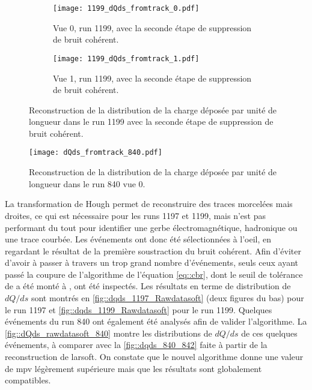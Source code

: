       \begin{figure}[htbp]
        \centering
        \begin{subfigure}[t]{0.48\textwidth}
          \centering
          \texttt{[image: 1199\_dQds\_fromtrack\_0.pdf]}
          \caption[]{Vue 0, run 1199, avec la seconde étape de suppression de bruit cohérent.}
        \end{subfigure}\hfill
        \begin{subfigure}[t]{0.48\textwidth}
          \centering
          \texttt{[image: 1199\_dQds\_fromtrack\_1.pdf]}
          \caption[]{Vue 1, run 1199, avec la seconde étape de suppression de bruit cohérent.}
        \end{subfigure}
        \caption[Reconstruction de la distribution de la charge déposée par unité de longueur dans le run 1199.]{\label{fig::dqds_1199_Rawdatasoft}Reconstruction de la distribution de la charge déposée par unité de longueur dans le run 1199 avec la seconde étape de suppression de bruit cohérent.}
      \end{figure}

      \begin{figure}[htbp]      
        \centering
        \texttt{[image: dQds\_fromtrack\_840.pdf]}
        \caption[Test de l'algorithme sur le run 840.]{\label{fig::dQds_rawdatasoft_840}Reconstruction de la distribution de la charge déposée par unité de longueur dans le run 840 vue 0.}
      \end{figure}

      La transformation de Hough permet de reconstruire des traces morcelées mais droites, ce qui est nécessaire pour les runs 1197 et 1199, mais n'est pas performant du tout pour identifier une gerbe électromagnétique, hadronique ou une trace courbée. Les événements ont donc été sélectionnées à l'oeil, en regardant le résultat de la première soustraction du bruit cohérent. Afin d'éviter d'avoir à passer à travers un trop grand nombre d'événements, seuls ceux ayant passé la coupure de l'algorithme de l'équation \eqref{eq::cbr}, dont le seuil de tolérance de  a été monté à , ont été inspectés. Les résultats en terme de distribution de $dQ/ds$ sont montrés en \autoref{fig::dqds_1197_Rawdatasoft} (deux figures du bas) pour le run 1197 et \autoref{fig::dqds_1199_Rawdatasoft} pour le run 1199. Quelques événements du run 840 ont également été analysés afin de valider l'algorithme. La \autoref{fig::dQds_rawdatasoft_840} montre les distributions de $dQ/ds$ de ces quelques événements, à comparer avec la \autoref{fig::dqds_840_842} faite à partir de la reconstruction de \gls{larsoft}. On constate que le nouvel algorithme donne une valeur de \gls{mpv} légèrement supérieure mais que les résultats sont globalement compatibles. 

\FloatBarrier

\printbibliography
